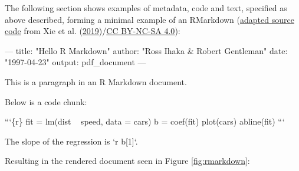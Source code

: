 \documentclass[12pt,a4paper,twoside]{article}
\newenvironment{Shaded}{\begin{snugshade}}{\end{snugshade}}
\newcommand{\AttributeTok}[1]{\textcolor[rgb]{0.77,0.63,0.00}{#1}}
\newcommand{\BaseNTok}[1]{\textcolor[rgb]{0.00,0.00,0.81}{#1}}
\newcommand{\FunctionTok}[1]{\textcolor[rgb]{0.00,0.00,0.00}{#1}}
\newcommand{\NormalTok}[1]{#1}
\newcommand{\OtherTok}[1]{\textcolor[rgb]{0.56,0.35,0.01}{#1}}
\newcommand{\StringTok}[1]{\textcolor[rgb]{0.31,0.60,0.02}{#1}}
\begin{document}
The following section shows examples of metadata, code and text, specified as above described, forming a minimal example of an RMarkdown (\href{https://github.com/rstudio/rmarkdown-book/blob/a10b33d47a2b223a8ef643c245d45e4dfc7091b8/02-basics.Rmd\#L15-L39}{adapted source code} from Xie et al. (\protect\hyperlink{ref-xieMarkdownDefinitiveGuide2019}{2019})/\href{https://creativecommons.org/licenses/by-nc-sa/4.0/}{CC BY-NC-SA 4.0}):

\begin{Shaded}
\begin{Highlighting}[]
\OtherTok{---}
\FunctionTok{title:}\AttributeTok{ }\StringTok{"Hello R Markdown"}
\FunctionTok{author:}\AttributeTok{ }\StringTok{"Ross Ihaka & Robert Gentleman"}
\FunctionTok{date:}\AttributeTok{ }\StringTok{"1997-04-23"}
\FunctionTok{output:}\AttributeTok{ pdf_document}
\OtherTok{---}
\end{Highlighting}
\end{Shaded}

\begin{Shaded}
\begin{Highlighting}[]
\NormalTok{This is a paragraph in an R Markdown document.}

\NormalTok{Below is a code chunk:}

\BaseNTok{```\{r\}}
\BaseNTok{fit = lm(dist ~ speed, data = cars)}
\BaseNTok{b = coef(fit)}
\BaseNTok{plot(cars)}
\BaseNTok{abline(fit)}
\BaseNTok{```}

\NormalTok{The slope of the regression is }\BaseNTok{`r b[1]`}\NormalTok{.}
\end{Highlighting}
\end{Shaded}

Resulting in the rendered document seen in Figure \ref{fig:rmarkdown}:
\end{document}
